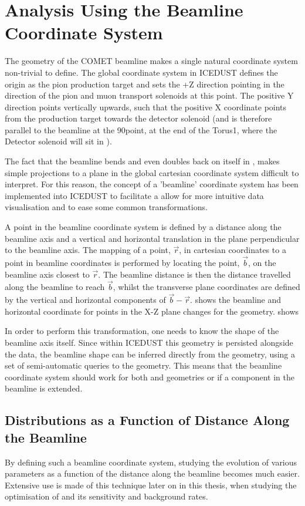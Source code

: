 \section{Analysis Using the Beamline Coordinate System}
The geometry of the COMET beamline makes a single natural coordinate system non-trivial to define.
The global coordinate system in ICEDUST defines the origin as the pion production target and sets the +Z direction pointing in the direction of the pion and muon transport solenoids at this point.
The positive Y direction points vertically upwards, such that the positive X coordinate points from the production target towards the \phaseII detector solenoid (and is therefore parallel to the beamline at the 90\degree point, at the end of the Torus1, where the Detector solenoid will sit in \phaseI). 

The fact that the beamline bends and even doubles back on itself in \phaseII, makes simple projections to a plane in the global cartesian coordinate system difficult to interpret.
For this reason, the concept of a 'beamline' coordinate system has been implemented into ICEDUST to facilitate a allow for more intuitive data visualisation and to ease some common transformations.

\FigSoftwareBeamline 
A point in the beamline coordinate system is defined by a distance along the beamline axis and a vertical and horizontal translation in the plane perpendicular to the beamline axis.
The mapping of a point, $\vec{r}$, in cartesian coordinates to a point in beamline coordinates is performed by locating the point, $\vec{b}$, on the beamline axis closest to $\vec{r}$.
The beamline distance is then the distance travelled along the beamline to reach $\vec{b}$, whilst the transverse plane coordinates are defined by the vertical and horizontal components of $\vec{b}-\vec{r}$.
 shows the beamline and horizontal coordinate for points in the X-Z plane changes for the \phaseI geometry.
shows

In order to perform this transformation, one needs to know the shape of the beamline axis itself.
Since within ICEDUST this geometry is persisted alongside the data, the beamline shape can be inferred directly from the geometry, using a set of semi-automatic queries to the geometry.
This means that the beamline coordinate system should work for both \phaseI and \phaseII geometries or if a component in the beamline is extended.

\subsection{Distributions as a Function of Distance Along the Beamline}
By defining such a beamline coordinate system, studying the evolution of various parameters as a function of the distance along the beamline becomes much easier.
Extensive use is made of this technique later on in this thesis, when studying the optimisation of \phaseII and its sensitivity and background rates.

